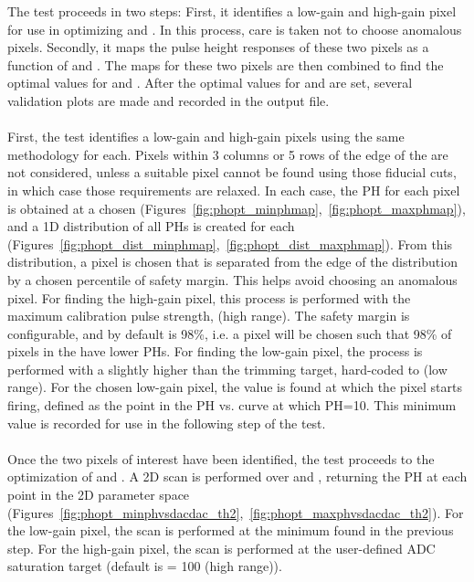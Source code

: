 The \phopt test proceeds in two steps:  
First, it identifies a low-gain and high-gain pixel for use in optimizing \phscale and \phoffset.
In this process, care is taken not to choose anomalous pixels.
Secondly, it maps the pulse height responses of these two pixels as a function of \phscale and \phoffset.
The maps for these two pixels are then combined to find the optimal values for \phscale and \phoffset.
After the optimal values for \phscale and \phoffset are set, several validation plots are made and recorded in the output file.
\\\\
First, the test identifies a low-gain and high-gain pixels using the same methodology for each.
Pixels within 3 columns or 5 rows of the edge of the \roc are not considered, 
unless a suitable pixel cannot be found using those fiducial cuts, in which case those requirements are relaxed.
In each case, the PH for each pixel is obtained at a chosen \vcal (Figures~\ref{fig:phopt_minphmap},~\ref{fig:phopt_maxphmap}), 
and a 1D distribution of all PHs is created for each \roc (Figures~\ref{fig:phopt_dist_minphmap},~\ref{fig:phopt_dist_maxphmap}). 
From this distribution, a pixel is chosen that is separated from the edge of the distribution by a chosen percentile of safety margin.
This helps avoid choosing an anomalous pixel.
For finding the high-gain pixel, this process is performed with the maximum calibration pulse strength,  (high range).
The safety margin is configurable, and by default is 98\%, i.e. a pixel will be chosen such that 98\% of pixels in the \roc have lower PHs.
For finding the low-gain pixel, the process is performed with a \vcal slightly higher than the \vcal trimming target, 
hard-coded to  (low range).
For the chosen low-gain pixel, the \vcal value is found at which the pixel starts firing, 
defined as the point in the PH vs. \vcal curve at which PH=10.
This minimum \vcal value is recorded for use in the following step of the test.
\\\\
Once the two pixels of interest have been identified, the test proceeds to the optimization of \phscale and \phoffset.
A 2D scan is performed over \phscale and \phoffset, returning the PH at each point in the 2D parameter space
(Figures~\ref{fig:phopt_minphvsdacdac_th2},~\ref{fig:phopt_maxphvsdacdac_th2}).
For the low-gain pixel, the scan is performed at the minimum \vcal found in the previous step.
For the high-gain pixel, the scan is performed at the user-defined ADC saturation target (default is \vcal = 100 (high range)).
